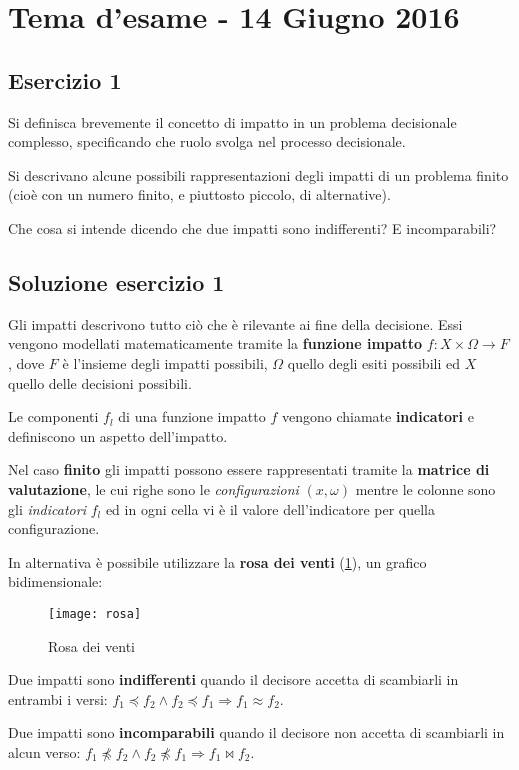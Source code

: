 \documentclass[\main/main.tex]{subfiles}
\begin{document}
\section{Tema d'esame - 14 Giugno 2016}

\subsection{Esercizio 1}

Si definisca brevemente il concetto di impatto in un problema decisionale complesso, specificando che ruolo svolga nel processo decisionale.

Si descrivano alcune possibili rappresentazioni degli impatti di un problema finito (cioè con un numero finito, e piuttosto piccolo, di alternative).

Che cosa si intende dicendo che due impatti sono indifferenti? E incomparabili?

\subsection{Soluzione esercizio 1}
Gli impatti descrivono tutto ciò che è rilevante ai fine della decisione. Essi vengono modellati matematicamente tramite la \textbf{funzione impatto} $f: X \times \Omega \rightarrow F$, dove $F$ è l'insieme degli impatti possibili, $\Omega$ quello degli esiti possibili ed $X$ quello delle decisioni possibili.

Le componenti $f_l$ di una funzione impatto $f$ vengono chiamate \textbf{indicatori} e definiscono un aspetto dell'impatto.

Nel caso \textbf{finito} gli impatti possono essere rappresentati tramite la \textbf{matrice di valutazione}, le cui righe sono le \textit{configurazioni} $(x,\omega)$ mentre le colonne sono gli \textit{indicatori} $f_l$ ed in ogni cella vi è il valore dell'indicatore per quella configurazione.

In alternativa è possibile utilizzare la \textbf{rosa dei venti} (\ref{rosa_dei_venti}), un grafico bidimensionale:

\begin{figure}
  \texttt{[image: rosa]}
  \caption{Rosa dei venti}
  \label{rosa_dei_venti}
\end{figure}

Due impatti sono \textbf{indifferenti} quando il decisore accetta di scambiarli in entrambi i versi: $f_1 \preceq f_2  \land f_2 \preceq f_1 \Rightarrow f_1 \approx f_2$.

Due impatti sono \textbf{incomparabili} quando il decisore non accetta di scambiarli in alcun verso: $f_1 \npreceq f_2  \land f_2 \npreceq f_1 \Rightarrow f_1 \bowtie f_2$.
\end{document}
